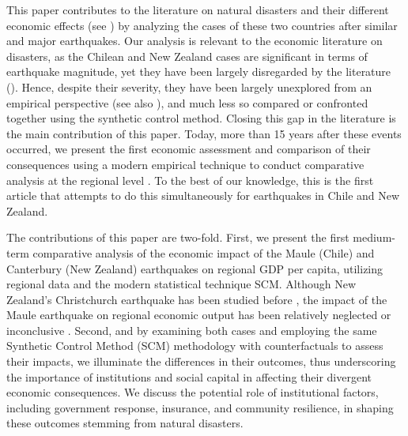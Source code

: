\documentclass[12pt]{article}
\begin{document}
This paper contributes to the literature on natural disasters and their different economic effects (see \cite{barone2014natural, farzanegan2025bam, noydupont2018longterm, platt2016measuring, storr2016community}) by analyzing the cases of these two countries after similar and major earthquakes. Our analysis is relevant to the economic literature on disasters, as the Chilean and New Zealand cases are significant in terms of earthquake magnitude, yet they have been largely disregarded by the literature (\cite{cardenasjiron2012chilean, dussaillant2014trust, miller2013estimating}). Hence, despite their severity, they have been largely unexplored from an empirical perspective (see also \parencite{aguirre2023medium, nguyen2020insurance}), and much less so compared or confronted together using the synthetic control method. Closing this gap in the literature is the main contribution of this paper. Today, more than 15 years after these events occurred, we present the first economic assessment and comparison of their consequences using a modern empirical technique to conduct comparative analysis at the regional level \parencite{abadie2010synthetic, abadie2021jel, barone2014natural, dupont2015kobe}. To the best of our knowledge, this is the first article that attempts to do this simultaneously for earthquakes in Chile and New Zealand.     

The contributions of this paper are two-fold. First, we present the first medium-term comparative analysis of the economic impact of the Maule (Chile) and Canterbury (New Zealand) earthquakes on regional GDP per capita, utilizing regional data and the modern statistical technique SCM. Although New Zealand's Christchurch earthquake has been studied before \parencite{nguyen2020insurance, doyle2015short, miller2013estimating}, the impact of the Maule earthquake on regional economic output has been relatively neglected or inconclusive \parencite{aguirre2023medium, eclac2010overview}. Second, and by examining both cases and employing the same Synthetic Control Method (SCM) methodology with counterfactuals to assess their impacts, we illuminate the differences in their outcomes, thus underscoring the importance of institutions and social capital in affecting their divergent economic consequences. We discuss the potential role of institutional factors, including government response, insurance, and community resilience, in shaping these outcomes stemming from natural disasters. 
\end{document}
